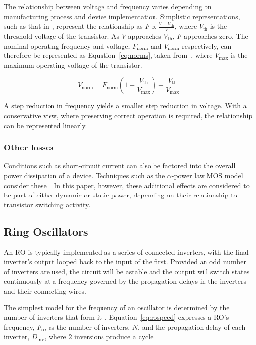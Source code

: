 \documentclass[a4paper,twocolumn,DIV=16]{scrartcl}
\begin{document}
The relationship between voltage and frequency varies depending on manufacturing
process and device implementation. Simplistic representations, such as that
in~\cite{kim2003leakage}, represent the relationship as $F \propto \frac{V -
V_{\text{th}}}{V}$, where $V_{\text{th}}$ is the threshold voltage of the
transistor. As $V$ approaches $V_\text{th}$, $F$ approaches zero. The nominal
operating frequency and voltage, $F_{\text{norm}}$ and $V_{\text{norm}}$
respectively, can therefore be represented as Equation~\ref{eq:norms}, taken
from~\cite{kim2003leakage}, where $V_{\text{max}}$ is the maximum operating
voltage of the transistor.

\begin{equation}
V_{\text{norm}} = 
    F_{\text{norm}}\left(1 - \frac{V_{\text{th}}}{V_\text{max}}\right)
    + \frac{V_{\text{th}}}{V_{\text{max}}}
\label{eq:norms}
\end{equation}

A step reduction in frequency yields a smaller step reduction in voltage. With a
conservative view, where preserving correct operation is required, the
relationship can be represented linearly.

\subsubsection*{Other losses}

Conditions such as short-circuit current can also be factored into the overall
power dissipation of a device. Techniques such as the $\alpha$-power law MOS
model consider these~\cite{Sakurai1988}. In this paper, however, these
additional effects are considered to be part of either dynamic or static power,
depending on their relationship to transistor switching activity.

\subsection{Ring Oscillators}

An RO is typically implemented as a series of connected inverters, with the
final inverter's output looped back to the input of the first. Provided an
odd number of inverters are used, the circuit will be astable and the output
will switch states continuously at a frequency governed by the propagation
delays in the inverters and their connecting wires.

The simplest model for the frequency of an oscillator is determined by the
number of inverters that form it~\cite{Mandal2010}. Equation~\ref{eq:rospeed}
expresses a RO's frequency, $F_{\text{o}}$, as the number of inverters,
$N$, and the propagation delay of each inverter, $D_{\text{inv}}$, where $2$
inversions produce a cycle.
\end{document}
